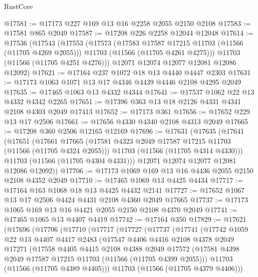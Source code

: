 \begin{lexlean}{RustCore}
\begin{coremodule}
@17581 := @17173 @227 @169 @13 @16 @2258 @2055 @2150 @2108
@17583 := @17581 @865 @2049
@17587 := @17208 @226 @2258 @12044 @12048
@17614 := @17536
    (@17543
      (@17553
        (@17573
          (@17583 @17587 @17215 @11703 (@11566 (@11705 @4269 @2055)))
          @11703
          (@11566 (@11705 @4261 @4275)))
        @11703
        (@11566 (@11705 @4251 @4276)))
      @12071
      @12074
      @12077
      @12081
      @12086
      @12092)
@17621 := @17164 @237 @1072 @18 @13 @4440 @4447 @2303
@17631 := @17173 @1063 @1071 @13 @17 @4346 @4439 @4446 @2108 @4295 @2049
@17635 := @17465 @1063 @13 @4332 @4344
@17641 := @17537 @1062 @22 @13 @4332 @4342 @2265
@17651 := @17396 @363 @13 @18 @2126 @4331 @4341 @2108 @4303 @2049 @17413
@17652 := @17173 @361
@17656 := @17652 @229 @13 @17 @2506
@17661 := @17656 @4330 @4340 @2108 @4313 @2049
@17665 := @17208 @360 @2506 @12165 @12169
@17696 := @17631
    (@17635
      (@17641
        (@17651
          (@17661
            @17665
            (@17581 @4323 @2049 @17587 @17215 @11703 (@11566 (@11705 @4324 @2055)))
            @11703
            (@11566 (@11705 @4314 @4330)))
          @11703
          (@11566 (@11705 @4304 @4331)))
        @12071
        @12074
        @12077
        @12081
        @12086
        @12092))
@17706 := @17173 @1069 @169 @13 @16 @4436 @2055 @2150 @2108 @4352 @2049
@17710 := @17465 @1069 @13 @4425 @4434
@17717 := @17164 @163 @1068 @18 @13 @4425 @4432 @2141
@17727 := @17652 @1067 @13 @17 @2506 @4424 @4431 @2108 @4360 @2049 @17665
@17737 := @17173 @1065 @169 @13 @16 @4421 @2055 @2150 @2108 @4370 @2049
@17741 := @17465 @1065 @13 @4407 @4419
@17742 := @17164 @350
@17829 := @17621
    (@17696
      (@17706
        (@17710
          (@17717
            (@17727
              (@17737
                (@17741
                  (@17742
                    @1059
                    @22
                    @13
                    @4407
                    @4417
                    @2483
                    (@17547
                      @4406
                      @4416
                      @2108
                      @4378
                      @2049
                      @17271
                      (@17558
                        @4405
                        @4415
                        @2108
                        @4388
                        @2049
                        @17572
                        (@17581 @4398 @2049 @17587 @17215 @11703 (@11566 (@11705 @4399 @2055)))
                        @11703
                        (@11566 (@11705 @4389 @4405)))
                      @11703
                      (@11566 (@11705 @4379 @4406)))

\end{coremodule}
\end{lexlean}
